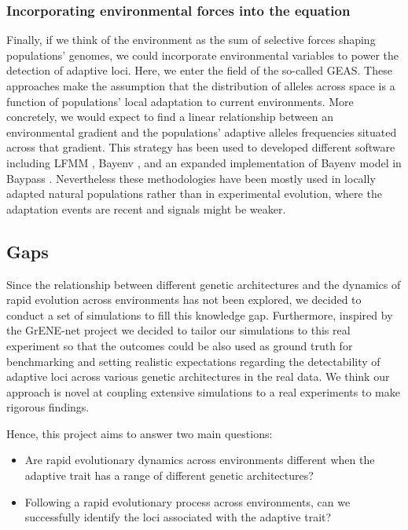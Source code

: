\documentclass{article}
\begin{document}
\subsubsection{Incorporating environmental forces into the equation}
Finally, if we think of the environment as the sum of selective forces shaping populations' genomes, we could incorporate environmental variables to power the detection of adaptive loci. Here, we enter the field of the so-called GEAS. These approaches make the assumption that the distribution of alleles across space is a function of populations' local adaptation to current environments. More concretely, we would expect to find a linear relationship between an environmental gradient and the populations' adaptive alleles frequencies situated across that gradient. This strategy has been used to developed different software including LFMM \citep{Frichot2013-mg}, Bayenv \citep{Gunther2013-fw}, and an expanded implementation of Bayenv model in Baypass \citep{Gautier2015-lp}. Nevertheless these methodologies have been mostly used in locally adapted natural populations rather than in experimental evolution, where the adaptation events are recent and signals might be weaker. 

\subsection{Gaps}
Since the relationship between different genetic architectures and the dynamics of rapid evolution across environments has not been explored, we decided to conduct a set of simulations to fill this knowledge gap. Furthermore, inspired by the GrENE-net project we decided to tailor our simulations to this real experiment so that the outcomes could be also used as ground truth for benchmarking and setting realistic expectations regarding the detectability of adaptive loci across various genetic architectures in the real data. We think our approach is novel at coupling extensive simulations to a real experiments to make rigorous findings. 

Hence, this project aims to answer two main questions: 
\begin{itemize}
    \item Are rapid evolutionary dynamics across environments different when the adaptive trait has a range of different genetic architectures? 
    \item Following a rapid evolutionary process across environments, can we successfully identify the loci associated with the adaptive trait?
\end{itemize}
\end{document}
